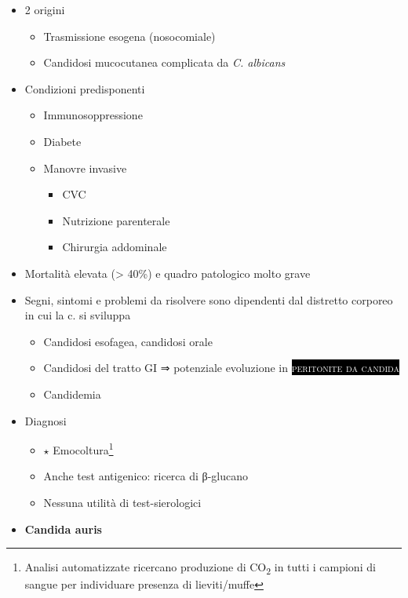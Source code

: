 \documentclass[italian,]{article}
\providecommand{\tightlist}{%
  \setlength{\itemsep}{0pt}\setlength{\parskip}{0pt}}
\newcommand{\pat}[1]{\colorbox{black}{\textcolor{white}{\textsc{#1}}}}
\newcommand{\goldstandard}{\textcircled{$\star$} }                      %
\begin{document}
\begin{itemize}
\tightlist
\item
  2 origini

  \begin{itemize}
  \tightlist
  \item
    Trasmissione esogena (nosocomiale)
  \item
    Candidosi mucocutanea complicata da \emph{C. albicans}
  \end{itemize}
\item
  Condizioni predisponenti

  \begin{itemize}
  \tightlist
  \item
    Immunosoppressione
  \item
    Diabete
  \item
    Manovre invasive

    \begin{itemize}
    \tightlist
    \item
      CVC
    \item
      Nutrizione parenterale
    \item
      Chirurgia addominale
    \end{itemize}
  \end{itemize}
\item
  Mortalità elevata (\textgreater{} 40\%) e quadro patologico molto
  grave
\item
  Segni, sintomi e problemi da risolvere sono dipendenti dal distretto
  corporeo in cui la c. si sviluppa

  \begin{itemize}
  \tightlist
  \item
    Candidosi esofagea, candidosi orale
  \item
    Candidosi del tratto GI ⇒ potenziale evoluzione in
    \pat{peritonite da candida}
  \item
    Candidemia
  \end{itemize}
\item
  Diagnosi

  \begin{itemize}
  \tightlist
  \item
    \goldstandard Emocoltura\footnote{Analisi automatizzate ricercano
      produzione di CO\textsubscript{2} in tutti i campioni di sangue
      per individuare presenza di lieviti/muffe}
  \item
    Anche test antigenico: ricerca di β-glucano
  \item
    Nessuna utilità di test-sierologici
  \end{itemize}
\item
  \textbf{Candida auris}


\end{itemize}
\end{document}
